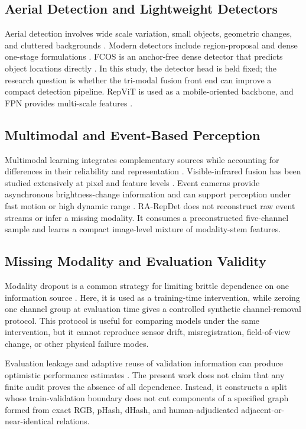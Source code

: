 \documentclass[pdflatex,sn-basic,Numbered,iicol]{sn-jnl}
\begin{document}
\subsection{Aerial Detection and Lightweight Detectors}
Aerial detection involves wide scale variation, small objects, geometric changes, and cluttered backgrounds \cite{cheng2016survey,zhu2017deepRS,xia2022dota}. Modern detectors include region-proposal and dense one-stage formulations \cite{ren2017faster,lin2020focal}. FCOS is an anchor-free dense detector that predicts object locations directly \cite{tian2019fcos}. In this study, the detector head is held fixed; the research question is whether the tri-modal fusion front end can improve a compact detection pipeline. RepViT is used as a mobile-oriented backbone, and FPN provides multi-scale features \cite{wang2024repvit,lin2017fpn}.

\subsection{Multimodal and Event-Based Perception}
Multimodal learning integrates complementary sources while accounting for differences in their reliability and representation \cite{baltrusaitis2019multimodal,ramachandram2017deep}. Visible-infrared fusion has been studied extensively at pixel and feature levels \cite{li2017pixel,ma2019surveyfusion,li2019densefuse}. Event cameras provide asynchronous brightness-change information and can support perception under fast motion or high dynamic range \cite{lichtsteiner2008sensor,gallego2022event,gehrig2021dsec}. RA-RepDet does not reconstruct raw event streams or infer a missing modality. It consumes a preconstructed five-channel sample and learns a compact image-level mixture of modality-stem features.

\subsection{Missing Modality and Evaluation Validity}
Modality dropout is a common strategy for limiting brittle dependence on one information source \cite{neverova2016moddrop}. Here, it is used as a training-time intervention, while zeroing one channel group at evaluation time gives a controlled synthetic channel-removal protocol. This protocol is useful for comparing models under the same intervention, but it cannot reproduce sensor drift, misregistration, field-of-view change, or other physical failure modes.

Evaluation leakage and adaptive reuse of validation information can produce optimistic performance estimates \cite{kapoor2023leakage,cawley2010overfitting}. The present work does not claim that any finite audit proves the absence of all dependence. Instead, it constructs a split whose train-validation boundary does not cut components of a specified graph formed from exact RGB, pHash, dHash, and human-adjudicated adjacent-or-near-identical relations.
\end{document}
